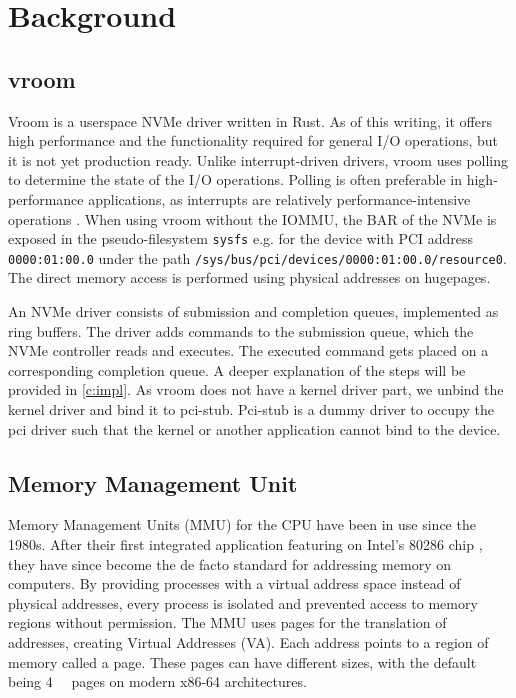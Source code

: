 \chapter{Background}

\section{vroom}
Vroom is a userspace NVMe driver written in Rust. As of this writing, it offers high performance and the functionality required for general I/O operations, but it is not yet production ready. Unlike interrupt-driven drivers, vroom uses polling to determine the state of the I/O operations. Polling is often preferable in high-performance applications, as interrupts are relatively performance-intensive operations \cite{spdksubmitting}.
When using vroom without the IOMMU, the BAR of the NVMe is exposed in the pseudo-filesystem \texttt{sysfs} e.g. for the device with PCI address \texttt{0000:01:00.0} under the path \texttt{/sys/bus/pci/devices/0000:01:00.0/resource0}. The direct memory access is performed using physical addresses on hugepages.

An NVMe driver consists of submission and completion queues, implemented as ring buffers. The driver adds commands to the submission queue, which the NVMe controller reads and executes. The executed command gets placed on a corresponding completion queue. A deeper explanation of the steps will be provided in \autoref{c:impl}.
As vroom does not have a kernel driver part, we unbind the kernel driver and bind it to pci-stub. Pci-stub is a dummy driver to occupy the pci driver such that the kernel or another application cannot bind to the device.

\section{Memory Management Unit}
Memory Management Units (MMU) for the CPU have been in use since the 1980s. After their first integrated application featuring on Intel's 80286 chip \cite{intel80286}, they have since become the de facto standard for addressing memory on computers. By providing processes with a virtual address space instead of physical addresses, every process is isolated and prevented access to memory regions without permission. The MMU uses pages for the translation of addresses, creating Virtual Addresses (VA). Each address points to a region of memory called a page. These pages can have different sizes, with the default being \qty{4}{\kibi\byte} pages on modern x86-64 architectures.

